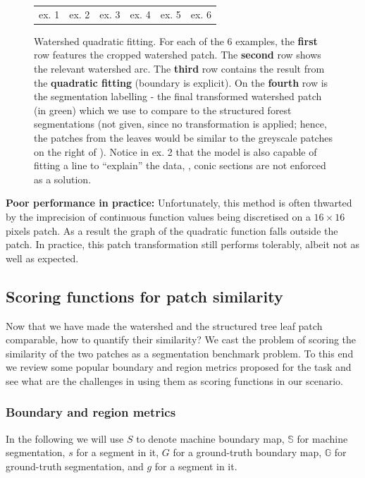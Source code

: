 \begin{figure}[ht!]
\begin{center}
\begin{tabular}{ c c c c c c }
  ex. 1 & ex. 2 & ex. 3 & ex. 4 & ex. 5 & ex. 6 \\
  \end{tabular}
\end{center}
\caption[Watershed quadratic fitting]{Watershed quadratic fitting. For each of the 6 examples, the {\bf first} row features the cropped watershed patch. The {\bf second} row shows the relevant watershed arc. The {\bf third} row contains the result from the {\bf quadratic fitting} (boundary is explicit). On the {\bf fourth} row is the segmentation labelling - the final transformed watershed patch (in green) which we use to compare to the structured forest segmentations (not given, since no transformation is applied; hence, the patches from the leaves would be similar to the greyscale patches on the right of ). Notice in ex. 2 that the model is also capable of fitting a line to ``explain'' the data, \ie, conic sections are not enforced as a solution.}
\label{fig:ws-quadratic-fitting}
\end{figure}

\textbf{Poor performance in practice:} Unfortunately, this method is often thwarted by the imprecision of continuous function values being discretised on a $16\times 16$ pixels patch. %
As a result the graph of the quadratic function falls outside the patch. In practice, this patch transformation still performs tolerably, %
albeit not as well as expected.

\subsection{Scoring functions for patch similarity}
Now that we have made the watershed and the structured tree leaf patch comparable, how to quantify their similarity? 
We cast the problem of scoring the similarity of the two patches as a segmentation benchmark problem. To this end we review some popular boundary and region metrics proposed for the task and see what are the challenges in using them as scoring functions in our scenario.

\subsubsection{Boundary and region metrics}
\label{sec:ch4-boundary-and-region-metrics-maths}
In the following we will use $S$ to denote machine boundary map, $\mathbb{S}$ for machine segmentation, $s$ for a segment in it, $G$ for a ground-truth boundary map, $\mathbb{G}$ for ground-truth segmentation, and $g$ for a segment in it.

